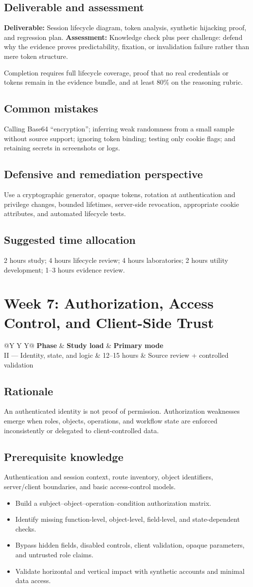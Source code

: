 \documentclass[11pt]{article}
\makeatletter
\newcommand{\weekheader}[4]{%
  \clearpage
  \section{Week #1: #2}
  \begin{tcolorbox}[colback=Navy,colframe=Navy,coltext=white]
    \begin{tabularx}{\linewidth}{@{}Y Y Y@{}}
      \textbf{Phase} & \textbf{Study load} & \textbf{Primary mode}\\
      #3 & #4 hours & Source review + controlled validation
    \end{tabularx}
  \end{tcolorbox}
}
\newcommand{\weekfield}[2]{%
  \Needspace{5\baselineskip}
  \subsection*{#1}
  #2
}
\newcommand{\deliverable}[1]{\textbf{Deliverable:} #1}
\newcommand{\assessment}[1]{\textbf{Assessment:} #1}
\makeatother
\begin{document}
\weekfield{Deliverable and assessment}{\deliverable{Session lifecycle diagram,
token analysis, synthetic hijacking proof, and regression plan.}
\assessment{Knowledge check plus peer challenge: defend why the evidence proves
predictability, fixation, or invalidation failure rather than mere token structure.}}

\begin{checkpoints}
Completion requires full lifecycle coverage, proof that no real credentials or
tokens remain in the evidence bundle, and at least 80\% on the reasoning rubric.
\end{checkpoints}

\weekfield{Common mistakes}{Calling Base64 ``encryption''; inferring weak
randomness from a small sample without source support; ignoring token binding;
testing only cookie flags; and retaining secrets in screenshots or logs.}

\weekfield{Defensive and remediation perspective}{Use a cryptographic generator,
opaque tokens, rotation at authentication and privilege changes, bounded lifetimes,
server-side revocation, appropriate cookie attributes, and automated lifecycle
tests.}

\weekfield{Suggested time allocation}{2 hours study; 4 hours lifecycle review; 4
hours laboratories; 2 hours utility development; 1--3 hours evidence review.}

\weekheader{7}{Authorization, Access Control, and Client-Side Trust}{II --- Identity, state, and logic}{12--15}

\weekfield{Rationale}{An authenticated identity is not proof of permission.
Authorization weaknesses emerge when roles, objects, operations, and workflow
state are enforced inconsistently or delegated to client-controlled data.}

\weekfield{Prerequisite knowledge}{Authentication and session context, route
inventory, object identifiers, server/client boundaries, and basic access-control
models.}

\begin{objectivebox}
\begin{itemize}
  \item Build a subject--object--operation--condition authorization matrix.
  \item Identify missing function-level, object-level, field-level, and state-dependent checks.
  \item Bypass hidden fields, disabled controls, client validation, opaque parameters, and untrusted role claims.
  \item Validate horizontal and vertical impact with synthetic accounts and minimal data access.
\end{itemize}
\end{objectivebox}
\end{document}
